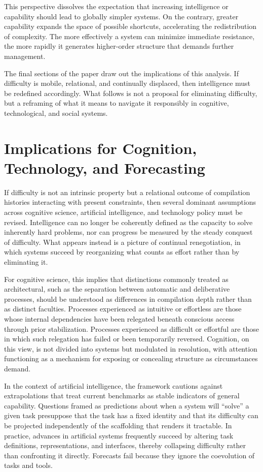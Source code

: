 \documentclass[12pt]{article}
\begin{document}
This perspective dissolves the expectation that increasing intelligence or capability should lead to globally simpler systems. On the contrary, greater capability expands the space of possible shortcuts, accelerating the redistribution of complexity. The more effectively a system can minimize immediate resistance, the more rapidly it generates higher-order structure that demands further management.

The final sections of the paper draw out the implications of this analysis. If difficulty is mobile, relational, and continually displaced, then intelligence must be redefined accordingly. What follows is not a proposal for eliminating difficulty, but a reframing of what it means to navigate it responsibly in cognitive, technological, and social systems.

\section{Implications for Cognition, Technology, and Forecasting}

If difficulty is not an intrinsic property but a relational outcome of compilation histories interacting with present constraints, then several dominant assumptions across cognitive science, artificial intelligence, and technology policy must be revised. Intelligence can no longer be coherently defined as the capacity to solve inherently hard problems, nor can progress be measured by the steady conquest of difficulty. What appears instead is a picture of continual renegotiation, in which systems succeed by reorganizing what counts as effort rather than by eliminating it.

For cognitive science, this implies that distinctions commonly treated as architectural, such as the separation between automatic and deliberative processes, should be understood as differences in compilation depth rather than as distinct faculties. Processes experienced as intuitive or effortless are those whose internal dependencies have been relegated beneath conscious access through prior stabilization. Processes experienced as difficult or effortful are those in which such relegation has failed or been temporarily reversed. Cognition, on this view, is not divided into systems but modulated in resolution, with attention functioning as a mechanism for exposing or concealing structure as circumstances demand.

In the context of artificial intelligence, the framework cautions against extrapolations that treat current benchmarks as stable indicators of general capability. Questions framed as predictions about when a system will “solve” a given task presuppose that the task has a fixed identity and that its difficulty can be projected independently of the scaffolding that renders it tractable. In practice, advances in artificial systems frequently succeed by altering task definitions, representations, and interfaces, thereby collapsing difficulty rather than confronting it directly. Forecasts fail because they ignore the coevolution of tasks and tools.
\end{document}
